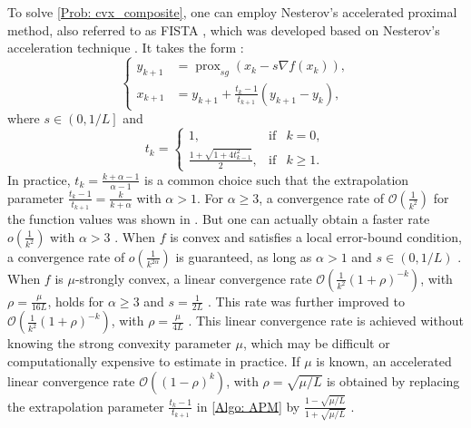 \documentclass[pdflatex,sn-mathphys-num]{sn-jnl}
\theoremstyle{thmstyleone}
\theoremstyle{thmstyletwo}
\theoremstyle{thmstylethree}
\DeclareMathOperator{\prox}{prox}
\begin{document}
To solve \eqref{Prob: cvx_composite}, one can employ Nesterov's accelerated proximal method, also referred to as FISTA \cite{Beck_2009}, which was developed based on Nesterov's acceleration technique \cite{Nesterov_1983}. It takes the form \cite{Beck_2009}: 
\begin{equation}\label{Algo: APM}\tag{APM}
\left\{
\begin{aligned}
y_{k+1} &= \prox_{sg}\left( x_k - s\nabla f(x_k) \right),\\
x_{k+1} &= y_{k+1} + \frac{t_k-1}{t_{k+1}}(y_{k+1}-y_k),
\end{aligned}
\right.
\end{equation}
where $s\in \left( 0, 1/L \right]$ and
\begin{equation}\label{E: t_k}
t_k = \left\{
\begin{array}{ccl}
1,&\text{if}& k=0,\\[3pt]
\frac{1+\sqrt{1+4t_{k-1}^2}}{2},&\text{if}& k\ge 1.
\end{array}
\right.
\end{equation} 
In practice, $t_k = \frac{k+\alpha-1}{\alpha-1}$ is a common choice such that the extrapolation parameter $\frac{t_k-1}{t_{k+1}} = \frac{k}{k+\alpha}$ with $\alpha>1$. For $\alpha\ge 3$, a convergence rate of $\mathcal{O}\left( \frac{1}{k^2} \right)$ for the function values was shown in \cite{Beck_2009}. But one can actually obtain a faster rate $o\left( \frac{1}{k^2} \right)$ with $\alpha > 3$ \cite{Attouch_2016}. When $f$ is convex and satisfies a local error-bound condition, a convergence rate of $o\left( \frac{1}{k^{2\alpha}} \right)$ is guaranteed, as long as $\alpha>1$ and $s\in(0,1/L)$ \cite{Liu_2024}. When $f$ is $\mu$-strongly convex, a linear convergence rate $\mathcal{O}\left( \frac{1}{k^2}(1 + \rho)^{-k}\right)$, with $\rho=\frac{\mu}{16L}$, holds for $\alpha\ge 3$ and $s=\frac{1}{2L}$ \cite{Shi_2024,Shi_2024_Monotone}. This rate was further improved to $\mathcal{O}\left( \frac{1}{k^2}(1+\rho)^{-k}\right)$, with $\rho=\frac{\mu}{4L}$ \cite{Bao_2023}. This linear convergence rate is achieved without knowing the strong convexity parameter $\mu$, which may be difficult or computationally expensive to estimate in practice. If $\mu$ is known, an accelerated linear convergence rate $\mathcal{O}\left( \left(1 - \rho \right)^k \right)$, with $\rho=\sqrt{\mu/L}$ is obtained by replacing the extrapolation parameter $\frac{t_k-1}{t_{k+1}}$ in \eqref{Algo: APM} by $\frac{1-\sqrt{\mu/L}}{1+\sqrt{\mu/L}}$ \cite{Nesterov_2004}.
\end{document}
